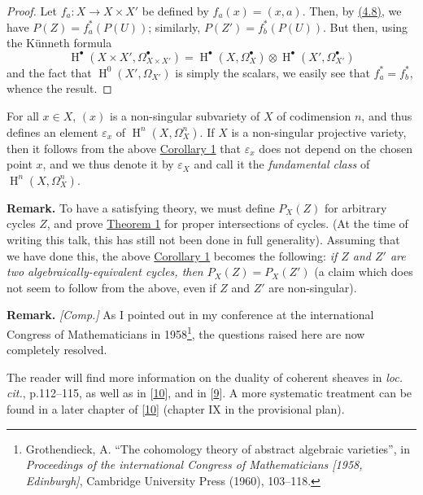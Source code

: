 \documentclass{article}
\newenvironment{rmenv}[1]
  {\phantomsection\par\smallskip\noindent\textbf{#1.}\rmfamily}
  {\par\smallskip}
\theoremstyle{definition}
\theoremstyle{definition}
\theoremstyle{definition}
\theoremstyle{definition}
\theoremstyle{remark}
\begin{document}
\begin{proof}
Let \(f_a\colon X\to X\times X'\) be defined by \(f_a(x)=(x,a)\).
Then, by \protect\hyperlink{fga-1-equation-4.8}{(4.8)}, we have \(P(Z)=f_a^*(P(U))\);
similarly, \(P(Z')=f_b^*(P(U))\).
But then, using the Künneth formula
\[
  \operatorname{H}^\bullet(X\times X',\Omega_{X\times X'}^\bullet)
  = \operatorname{H}^\bullet(X,\Omega_X^\bullet)\otimes\operatorname{H}^\bullet(X',\Omega_{X'}^\bullet)
\]
and the fact that \(\operatorname{H}^0(X',\Omega_{X'})\) is simply the scalars, we easily see that \(f_a^*=f_b^*\), whence the result.
\end{proof}

For all \(x\in X\), \((x)\) is a non-singular subvariety of \(X\) of codimension \(n\), and thus defines an element \(\varepsilon_x\) of \(\operatorname{H}^n(X,\Omega_X^n)\).
If \(X\) is a non-singular projective variety, then it follows from the above \protect\hyperlink{fga-1-theorem-1-corollary-1}{Corollary 1} that \(\varepsilon_x\) does not depend on the chosen point \(x\), and we thus denote it by \(\varepsilon_X\) and call it the \emph{fundamental class} of \(\operatorname{H}^n(X,\Omega_X^n)\).

\leavevmode{}%
\begin{rmenv}{Remark}
To have a satisfying theory, we must define \(P_X(Z)\) for arbitrary cycles \(Z\), and prove \protect\hyperlink{fga-1-theorem-1}{Theorem 1} for proper intersections of cycles.
(At the time of writing this talk, this has still not been done in full generality).
Assuming that we have done this, the above \protect\hyperlink{fga-1-theorem-1-corollary-1}{Corollary 1} becomes the following:
\emph{if \(Z\) and \(Z'\) are two algebraically-equivalent cycles, then \(P_X(Z)=P_X(Z')\)}
(a claim which does not seem to follow from the above, even if \(Z\) and \(Z'\) are non-singular).

\end{rmenv}

\begin{rmenv}{Remark}
\emph{{[}Comp.{]}}
As I pointed out in my conference at the international Congress of Mathematicians in 1958\footnote{Grothendieck, A. ``The cohomology theory of abstract algebraic varieties'', in \emph{Proceedings of the international Congress of Mathematicians {[}1958, Edinburgh{]}}, Cambridge University Press (1960), 103--118.}, the questions raised here are now completely resolved.

The reader will find more information on the duality of coherent sheaves in \emph{loc. cit.}, p.112--115, as well as in {[}\protect\hyperlink{ref-GD1960}{10}{]}, and in {[}\protect\hyperlink{ref-Gro1960b}{9}{]}.
A more systematic treatment can be found in a later chapter of {[}\protect\hyperlink{ref-GD1960}{10}{]} (chapter IX in the provisional plan).

\end{rmenv}
\end{document}
